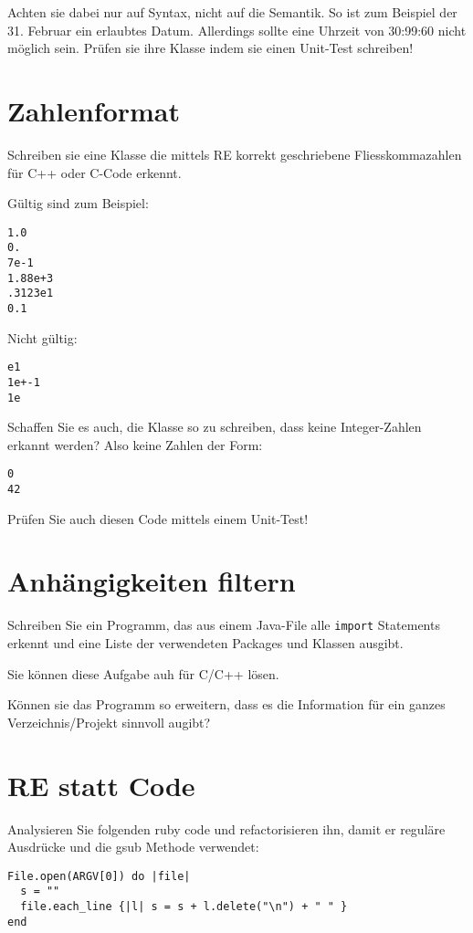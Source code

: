 \documentclass[a4paper,11pt,oneside]{scrbook}
\begin{document}
Achten sie dabei nur auf Syntax, nicht auf die Semantik. So ist zum Beispiel der 31. Februar ein erlaubtes Datum. Allerdings sollte eine Uhrzeit von 30:99:60 nicht möglich sein.
Prüfen sie ihre Klasse indem sie einen Unit-Test schreiben!

\section{Zahlenformat} %
\label{sec:zahlenformat}
Schreiben sie eine Klasse die mittels RE korrekt geschriebene Fliesskommazahlen für C++ oder C-Code erkennt.

Gültig sind zum Beispiel:
\begin{lstlisting}
1.0
0.
7e-1
1.88e+3
.3123e1
0.1
\end{lstlisting}

Nicht gültig:
\begin{lstlisting}
e1
1e+-1
1e
\end{lstlisting}

Schaffen Sie es auch, die Klasse so zu schreiben, dass keine Integer-Zahlen erkannt werden? Also keine Zahlen der Form:
\begin{lstlisting}
0
42
\end{lstlisting}

Prüfen Sie auch diesen Code mittels einem Unit-Test!


\section{Anhängigkeiten filtern} %
\label{sec:anhängigkeiten_filtern}
Schreiben Sie ein Programm, das aus einem Java-File alle \texttt{import} Statements erkennt und eine Liste der verwendeten Packages und Klassen ausgibt.

Sie können diese Aufgabe auh für C/C++ lösen.

Können sie das Programm so erweitern, dass es die Information für ein ganzes Verzeichnis/Projekt sinnvoll augibt?


\section{RE statt Code} %
\label{sec:re_statt_code}
Analysieren Sie folgenden ruby code und refactorisieren ihn, damit er reguläre Ausdrücke und die gsub Methode verwendet:

\begin{lstlisting}
File.open(ARGV[0]) do |file|
  s = ""
  file.each_line {|l| s = s + l.delete("\n") + " " } 
end
\end{lstlisting}
\end{document}
